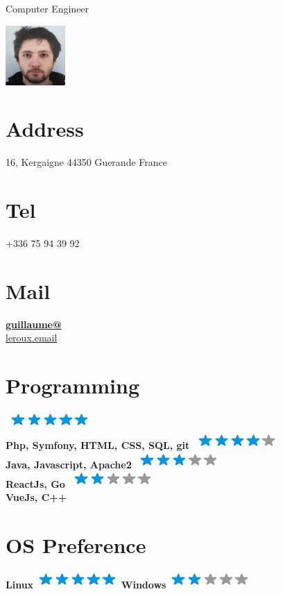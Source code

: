 \documentclass{friggeri-cv}
\begin{document}
 {}
	{Computer Engineer}


\begin{aside}
	\includegraphics[scale=1] {profil.png}
\section{Address}
	16, Kergaigne
	44350 Guerande
	France
	~
	\section{Tel}
	+336 75 94 39 92
	~
	\section{Mail}
	\href{mailto:guillaume@leroux.email}{\textbf{guillaume@}\\leroux.email}
	~
	\section{Programming}
	\includegraphics[scale=0.40]{img/5stars.png}\\\textbf{Php, Symfony, HTML, CSS, SQL, git}
	\includegraphics[scale=0.40]{img/4stars.png}\\\textbf{Java, Javascript, Apache2}
	\includegraphics[scale=0.40]{img/3stars.png}\\\textbf{ReactJs, Go}
	\includegraphics[scale=0.40]{img/2stars.png}\\\textbf{VueJs, C++}
	~
	\section{OS Preference}
	\textbf{Linux}\includegraphics[scale=0.40]{img/5stars.png}
	\textbf{Windows}\includegraphics[scale=0.40]{img/2stars.png}
	~

\end{aside}
\end{document}
